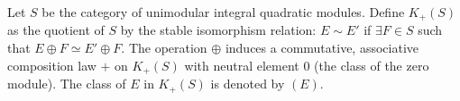 Let $S$ be the category of unimodular integral quadratic modules. Define $K_+(S)$ as the quotient of $S$ by the stable isomorphism relation: $E \sim E'$ if $\exists F \in S$ such that $E \oplus F \simeq E' \oplus F$. The operation $\oplus$ induces a commutative, associative composition law $+$ on $K_+(S)$ with neutral element $0$ (the class of the zero module). The class of $E$ in $K_+(S)$ is denoted by $(E)$.
